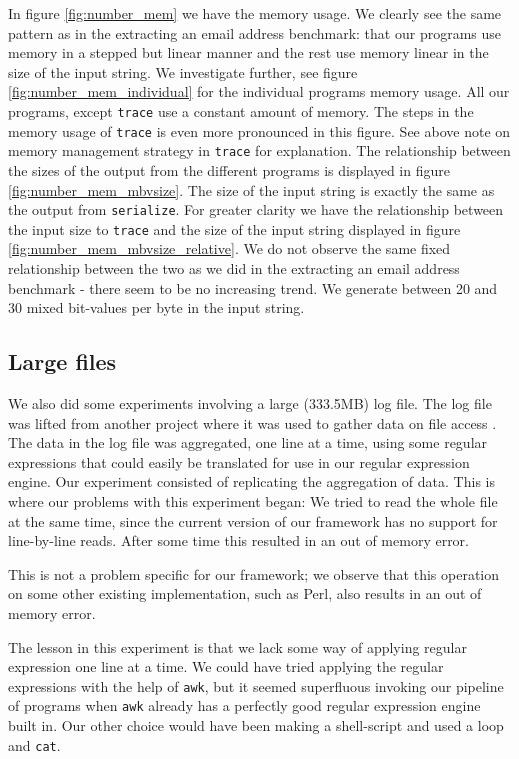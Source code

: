 In figure \vref{fig:number_mem} we have the memory usage. We clearly see the same pattern as in the extracting an
email address benchmark: that our programs use memory in a stepped but linear
manner and the rest use memory linear in the size of the input
string. We investigate further, see figure
\vref{fig:number_mem_individual} for the individual programs memory
usage. All our programs, except \texttt{trace} use a constant amount
of memory. The steps in the memory usage of \texttt{trace} is even
more pronounced in this figure. See above note on memory management
strategy in \texttt{trace} for explanation. The relationship between
the sizes of the output from the different programs is displayed in
figure \vref{fig:number_mem_mbvsize}. The size of the input string is
exactly the same as the output from \texttt{serialize}. For greater
clarity we have the relationship between the input size to
\texttt{trace} and the size of the input string displayed in figure
\vref{fig:number_mem_mbvsize_relative}. We do not observe the same
fixed relationship between the two as we did in the extracting an
email address benchmark - there seem to be no increasing trend. We
generate between 20 and 30 mixed bit-values per byte in the input
string.


\subsection{Large files}

We also did some experiments involving a large (333.5MB) log file. The
log file was lifted from another project where it was used to gather
data on file access \cite{jan2010}. The data in the log file was
aggregated, one line at a time, using some regular expressions that
could easily be translated for use in our regular expression
engine. Our experiment consisted of replicating the aggregation of
data. This is where our problems with this experiment began: We tried
to read the whole file at the same time, since the current version of our framework has no support for line-by-line reads. 
After some time this resulted in an out of memory error. 

This is not a problem specific for our framework; we observe that this operation on some
other existing implementation, such as Perl, also results in an out of
memory error. 

The lesson in this experiment is that we lack some way of applying
regular expression one line at a time. We could have tried applying
the regular expressions with the help of \texttt{awk}, but it seemed
superfluous invoking our pipeline of programs when \texttt{awk}
already has a perfectly good regular expression engine built in. Our
other choice would have been making a shell-script and used a loop and
\texttt{cat}. 

